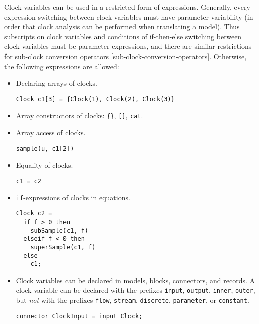 Clock variables can be used in a restricted form of expressions.
Generally, every expression switching between clock variables must have parameter variability (in order that clock analysis can be performed when translating a model).
Thus subscripts on clock variables and conditions of if-then-else switching between clock variables must be parameter expressions, and there are similar restrictions for sub-clock conversion operators \cref{sub-clock-conversion-operators}.
Otherwise, the following expressions are allowed:
\begin{itemize}
\item
  Declaring arrays of clocks.
  \begin{example}
  \lstinline!Clock c1[3] = {Clock(1), Clock(2), Clock(3)}!
  \end{example}
\item
  Array constructors of clocks: \lstinline!{}!, \lstinline![]!, \lstinline!cat!.
\item
  Array access of clocks.
  \begin{example}
  \lstinline!sample(u, c1[2])!
  \end{example}
\item
  Equality of clocks.
  \begin{example}
  \lstinline!c1 = c2!
  \end{example}
\item
  \lstinline!if!-expressions of clocks in equations.
  \begin{example}
\begin{lstlisting}[language=modelica]
Clock c2 =
  if f > 0 then
    subSample(c1, f)
  elseif f < 0 then
    superSample(c1, f)
  else
    c1;
\end{lstlisting}
  \lstinline!!
  \end{example}
\item
  Clock variables can be declared in models, blocks, connectors, and records.
  A clock variable can be declared with the prefixes \lstinline!input!, \lstinline!output!, \lstinline!inner!, \lstinline!outer!, but \emph{not} with the prefixes \lstinline!flow!, \lstinline!stream!, \lstinline!discrete!, \lstinline!parameter!, or \lstinline!constant!.
  \begin{example}
\begin{lstlisting}[language=modelica]
connector ClockInput = input Clock;
\end{lstlisting}
  \end{example}
\end{itemize}

